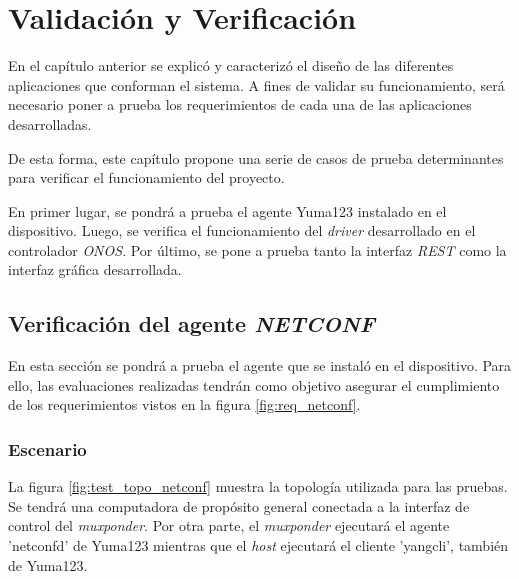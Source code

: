 
\chapter{Validación y Verificación} %
\label{Chapter6} %


En el capítulo anterior se explicó y caracterizó el diseño de las diferentes aplicaciones que conforman el sistema. A fines de validar su funcionamiento, será necesario poner a prueba los requerimientos de cada una de las aplicaciones desarrolladas. 

De esta forma, este capítulo propone una serie de casos de prueba determinantes para verificar el funcionamiento del proyecto. 

En primer lugar, se pondrá a prueba el agente Yuma123 instalado en el dispositivo. Luego, se verifica el funcionamiento del \textit{driver} desarrollado en el controlador \textit{ONOS}. Por último, se pone a prueba tanto la interfaz \textit{REST} como la interfaz gráfica desarrollada.


\section{Verificación del agente \textit{NETCONF}}

En esta sección se pondrá a prueba el agente que se instaló en el dispositivo. Para ello, las evaluaciones realizadas tendrán como objetivo asegurar el cumplimiento de los requerimientos vistos en la figura \ref{fig:req_netconf}.

\subsection{Escenario}

La figura \ref{fig:test_topo_netconf} muestra la topología utilizada para las pruebas. Se tendrá una computadora de propósito general conectada a la interfaz de control del \textit{muxponder}. Por otra parte, el \textit{muxponder} ejecutará el agente 'netconfd' de Yuma123 mientras que el \textit{host} ejecutará el cliente 'yangcli', también de Yuma123.

